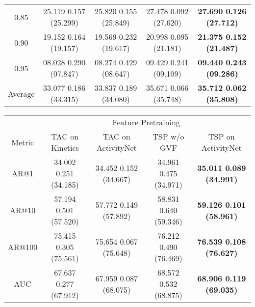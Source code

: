 \documentclass[10pt,twocolumn,letterpaper]{article}
\begin{document}
\begin{table*}[ht]
\begin{subtable}{\linewidth}
\begin{tabular}{c|cccc}
    0.85    & 25.119 {\scriptsize  0.157} (25.299) & 25.820 {\scriptsize  0.155} (25.849) & 27.478 {\scriptsize  0.092} (27.620) & \bf 27.690 {\scriptsize  0.126} (27.712) \\
    0.90    & 19.152 {\scriptsize  0.164} (19.157) & 19.569 {\scriptsize  0.232} (19.617) & 20.998 {\scriptsize  0.095} (21.181) & \bf 21.375 {\scriptsize  0.152} (21.487) \\
    0.95    & 08.028 {\scriptsize  0.290} (07.847) & 08.274 {\scriptsize  0.429} (08.647) & 09.429 {\scriptsize  0.241} (09.109) & \bf 09.440 {\scriptsize  0.243} (09.286) \\ \midrule
\rowcolor{Gray}
    Average & 33.077 {\scriptsize  0.186} (33.315) & 33.837 {\scriptsize  0.189} (34.080) & 35.671 {\scriptsize  0.066} (35.748) &\bf 35.712 {\scriptsize  0.062} (35.808) \\
    \bottomrule
    \end{tabular}
\end{subtable}

\begin{subtable}{\linewidth}
    \centering
    \vspace{+5pt}
    \caption{\bf Proposals on ActivityNet using BMN with R(2+1)D-34.}
    \vspace{-5pt}
    \begin{tabular}{c|cccc}
    \toprule 
            & \multicolumn{4}{c}{Feature Pretraining} \\ 
    Metric  & TAC on Kinetics                           & TAC on ActivityNet                        & TSP w/o GVF                               & TSP on ActivityNet \\ \midrule
    AR@1    & 34.002 {\scriptsize  0.251} (34.185) & 34.452 {\scriptsize  0.152} (34.667) & 34.961 {\scriptsize  0.475} (34.971) &\bf 35.011 {\scriptsize  0.089} (34.991) \\
    AR@10   & 57.194 {\scriptsize  0.501} (57.520) & 57.772 {\scriptsize  0.149} (57.892) & 58.831 {\scriptsize  0.640} (59.346) &\bf 59.126 {\scriptsize  0.101} (58.961) \\
    AR@100  & 75.415 {\scriptsize  0.305} (75.561) & 75.654 {\scriptsize  0.067} (75.648) & 76.212 {\scriptsize  0.490} (76.469) &\bf 76.539 {\scriptsize  0.108} (76.627) \\ \midrule
\rowcolor{Gray}
    AUC     & 67.637 {\scriptsize  0.277} (67.912) & 67.959 {\scriptsize  0.087} (68.075) & 68.572 {\scriptsize  0.532} (68.875) &\bf 68.906 {\scriptsize  0.119} (69.035) \\
    \bottomrule
    \end{tabular}
\end{subtable}


\end{table*}
\end{document}
